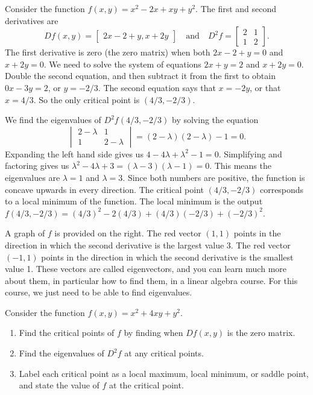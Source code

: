 \begin{example}
 Consider the function $f(x,y)=x^2-2x+xy+y^2$.  The first and second derivatives are $$Df(x,y)=\begin{bmatrix}2x-2+y,x+2y\end{bmatrix}
\quad\text{and}\quad 
 D^2f = \begin{bmatrix}2&1 \\1&2\end{bmatrix}.$$ 
The first derivative is zero (the zero matrix) when both $2x-2+y=0$ and $x+2y=0$. We need to solve the system of equations $2x+y=2$ and $x+2y=0$. Double the second equation, and then subtract it from the first to obtain $0x-3y=2$, or $y=-2/3$.  The second equation says that $x=-2y$, or that $x=4/3$.  So the only critical point is $(4/3,-2/3)$.
 
We find the eigenvalues of $D^2 f(4/3,-2/3)$ by solving the equation 
$$\begin{vmatrix}2-\lambda&1 \\1&2-\lambda\end{vmatrix} = (2-\lambda)(2-\lambda)-1=0.$$ 
 Expanding the left hand side gives us {$4-4\lambda + \lambda^2 -1 = 0$}. Simplifying and factoring gives us $\lambda^2-4\lambda +3 = (\lambda-3)(\lambda -1) = 0$. This means the eigenvalues are $\lambda = 1$ and $\lambda=3$. Since both numbers are positive, the function is concave upwards in every direction.  The critical point $(4/3,-2/3)$ corresponds to a local minimum of the function. The local minimum is the output $f(4/3,-2/3) = (4/3)^2-2(4/3)+(4/3)(-2/3)+(-2/3)^2$.

A graph of $f$ is provided on the right. 
The red vector $(1,1)$ points in the direction in which the second derivative is the largest value 3. 
The red vector $(-1,1)$ points in the direction in which the second derivative is the smallest value 1.
These vectors are called eigenvectors, and you can learn much more about them, in particular how to find them, in a linear algebra course. For this course, we just need to be able to find eigenvalues.
\end{example}
 
\begin{problem}
Consider the function $f(x,y)=x^2+4xy+y^2$.  
\begin{enumerate}
 \item Find the critical points of $f$ by finding when $Df(x,y)$ is the zero matrix.
 \item Find the eigenvalues of $D^2f$ at any critical points.
 \item Label each critical point as a local maximum, local minimum, or saddle point, and state the value of $f$ at the critical point.
\end{enumerate}
\end{problem}

